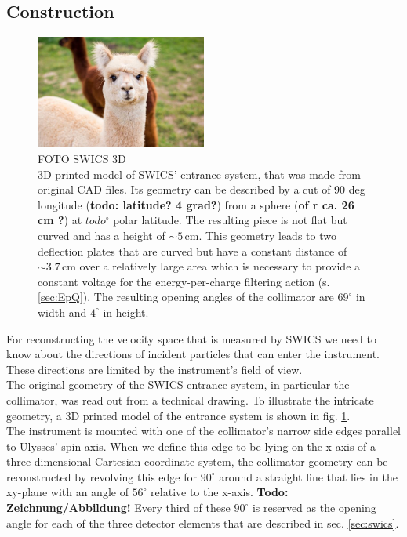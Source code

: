 \subsection{Construction} 
\label{subsec:construction}
\begin{figure}[h]
	\includegraphics[width=0.5\textwidth]{Figures/dummy.jpg}
	\centering
	\caption{FOTO SWICS 3D \\ 3D printed model of SWICS' entrance system, that was made from original CAD files. Its geometry can be described by a cut of 90 deg longitude (\textbf{todo: latitude? 4 grad?}) from a sphere (\textbf{of r ca. 26 cm ?}) at $todo ^\circ$ polar latitude. The resulting piece is not flat but curved and has a height of $\sim 5\,\mathrm{cm}$. This geometry leads to two deflection plates that are curved but have a constant distance of $\sim 3.7\,\mathrm{cm}$ over a relatively large area which is necessary to provide a constant voltage for the energy-per-charge filtering action (s. \ref{sec:EpQ}). The resulting opening angles of the collimator are $69^\circ$ in width and $4^\circ$ in height.}
	\label{fig:3dcol}
\end{figure}
For reconstructing the velocity space that is measured by SWICS we need to know about the directions of incident particles that can enter the instrument. These directions are limited by the instrument's field of view.
\\
The original geometry of the SWICS entrance system, in particular the collimator, was read out from a technical drawing. To illustrate the intricate geometry, a 3D printed model of the entrance system is shown in fig. \ref{fig:3dcol}.\\
The instrument is mounted with one of the collimator's narrow side edges parallel to Ulysses' spin axis. When we define this edge to be lying on the x-axis of a three dimensional Cartesian coordinate system, the collimator geometry can be reconstructed by revolving this edge for $90^\circ$ around a straight line that lies in the xy-plane with an angle of $56^\circ$ relative to the x-axis. \textbf{Todo: Zeichnung/Abbildung!} Every third of these $90^\circ$ is reserved as the opening angle for each of the three detector elements that are described in sec. \ref{sec:swics}. \\ \\
